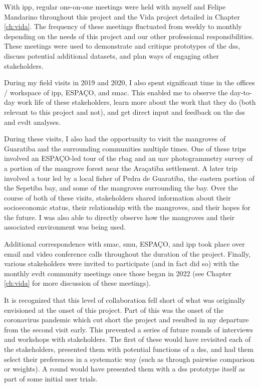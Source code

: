 With \ac{ipp}, regular one-on-one meetings were held with myself and Felipe Mandarino throughout this project and the Vida project detailed in Chapter \ref{ch:vida}. The frequency of these meetings fluctuated from weekly to monthly depending on the needs of this project and our other professional responsibilities. These meetings were used to demonstrate and critique prototypes of the \ac{dss}, discuss potential additional datasets, and plan ways of engaging other stakeholders.

During my field visits in 2019 and 2020, I also spent significant time in the offices / workspace of \ac{ipp}, ESPAÇO, and \ac{smac}. This enabled me to observe the day-to-day work life of these stakeholders, learn more about the work that they do (both relevant to this project and not), and get direct input and feedback on the \ac{dss} and \ac{evdt} analyses. 

During these visits, I also had the opportunity to visit the mangroves of Guaratiba and the surrounding communities multiple times. One of these trips involved an ESPAÇO-led tour of the \ac{rbag} and an \ac{uav} photogrammetry survey of a portion of the mangrove forest near the Araçatiba settlement. A later trip involved a tour led by a local fisher of Pedra de Guaratiba, the eastern portion of the Sepetiba bay, and some of the mangroves surrounding the bay. Over the course of both of these visits, stakeholders shared information about their socioeconomic status, their relationship with the mangroves, and their hopes for the future. I was also able to directly observe how the mangroves and their associated environment was being used.

Additional correspondence with \ac{smac}, \ac{smu}, ESPAÇO, and \ac{ipp} took place over email and video conference calls throughout the duration of the project. Finally, various stakeholders were invited to participate (and in fact did so) with the monthly \ac{evdt} community meetings once those began in 2022 (see Chapter \ref{ch:vida} for more discussion of these meetings). 

It is recognized that this level of collaboration fell short of what was originally envisioned at the onset of this project. Part of this was the onset of the coronavirus pandemic which cut short the project and resulted in my departure from the second visit early. This prevented a series of future rounds of interviews and workshops with stakeholders. The first of these would have revisited each of the stakeholders, presented them with potential functions of a \ac{dss}, and had them select their preferences in a systematic way (such as through pairwise comparison or weights). A round would have presented them with a \ac{dss} prototype itself as part of some initial user trials.

